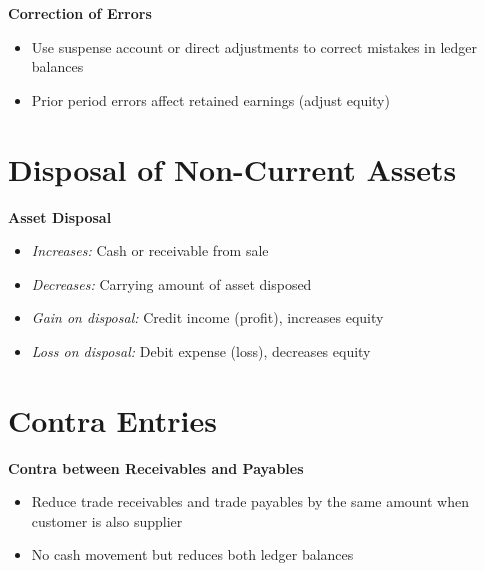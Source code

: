 \textbf{Correction of Errors}
\begin{itemize}
    \item Use suspense account or direct adjustments to correct mistakes in ledger balances
    \item Prior period errors affect retained earnings (adjust equity)
\end{itemize}

\section*{Disposal of Non-Current Assets}

\textbf{Asset Disposal}
\begin{itemize}
    \item \textit{Increases:} Cash or receivable from sale
    \item \textit{Decreases:} Carrying amount of asset disposed
    \item \textit{Gain on disposal:} Credit income (profit), increases equity
    \item \textit{Loss on disposal:} Debit expense (loss), decreases equity
\end{itemize}

\section*{Contra Entries}

\textbf{Contra between Receivables and Payables}
\begin{itemize}
    \item Reduce trade receivables and trade payables by the same amount when customer is also supplier
    \item No cash movement but reduces both ledger balances
\end{itemize}

